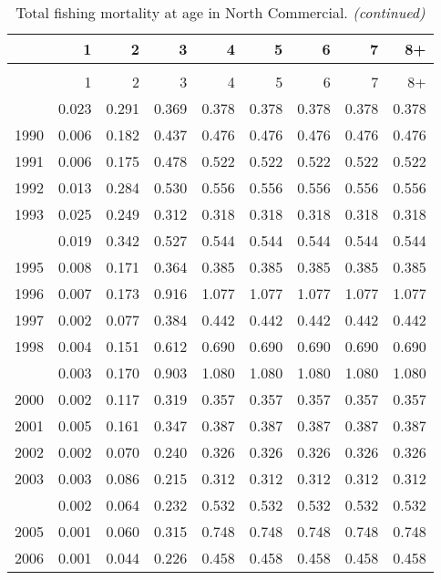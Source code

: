 \documentclass[
]{article}
\begin{document}
\begin{longtable}[t]{lrrrrrrrr}
\caption{\label{tab:North_Commercial-fleet-FAA-table}Total fishing mortality at age in North Commercial.}\\
\toprule
  & 1 & 2 & 3 & 4 & 5 & 6 & 7 & 8+\\
\midrule
\endfirsthead
\caption[]{Total fishing mortality at age in North Commercial. \textit{(continued)}}\\
\toprule
  & 1 & 2 & 3 & 4 & 5 & 6 & 7 & 8+\\
\midrule
\endhead

\endfoot
\bottomrule
\endlastfoot
1989 & 0.023 & 0.291 & 0.369 & 0.378 & 0.378 & 0.378 & 0.378 & 0.378\\
1990 & 0.006 & 0.182 & 0.437 & 0.476 & 0.476 & 0.476 & 0.476 & 0.476\\
1991 & 0.006 & 0.175 & 0.478 & 0.522 & 0.522 & 0.522 & 0.522 & 0.522\\
1992 & 0.013 & 0.284 & 0.530 & 0.556 & 0.556 & 0.556 & 0.556 & 0.556\\
1993 & 0.025 & 0.249 & 0.312 & 0.318 & 0.318 & 0.318 & 0.318 & 0.318\\
\addlinespace
1994 & 0.019 & 0.342 & 0.527 & 0.544 & 0.544 & 0.544 & 0.544 & 0.544\\
1995 & 0.008 & 0.171 & 0.364 & 0.385 & 0.385 & 0.385 & 0.385 & 0.385\\
1996 & 0.007 & 0.173 & 0.916 & 1.077 & 1.077 & 1.077 & 1.077 & 1.077\\
1997 & 0.002 & 0.077 & 0.384 & 0.442 & 0.442 & 0.442 & 0.442 & 0.442\\
1998 & 0.004 & 0.151 & 0.612 & 0.690 & 0.690 & 0.690 & 0.690 & 0.690\\
\addlinespace
1999 & 0.003 & 0.170 & 0.903 & 1.080 & 1.080 & 1.080 & 1.080 & 1.080\\
2000 & 0.002 & 0.117 & 0.319 & 0.357 & 0.357 & 0.357 & 0.357 & 0.357\\
2001 & 0.005 & 0.161 & 0.347 & 0.387 & 0.387 & 0.387 & 0.387 & 0.387\\
2002 & 0.002 & 0.070 & 0.240 & 0.326 & 0.326 & 0.326 & 0.326 & 0.326\\
2003 & 0.003 & 0.086 & 0.215 & 0.312 & 0.312 & 0.312 & 0.312 & 0.312\\
\addlinespace
2004 & 0.002 & 0.064 & 0.232 & 0.532 & 0.532 & 0.532 & 0.532 & 0.532\\
2005 & 0.001 & 0.060 & 0.315 & 0.748 & 0.748 & 0.748 & 0.748 & 0.748\\
2006 & 0.001 & 0.044 & 0.226 & 0.458 & 0.458 & 0.458 & 0.458 & 0.458\\

\end{longtable}
\end{document}
